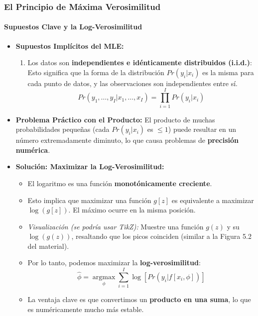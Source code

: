 \documentclass[aspectratio=169, 10pt]{beamer}
\begin{document}
\begin{frame}[shrink]
	\frametitle{El Principio de Máxima Verosimilitud}
	\framesubtitle{Supuestos Clave y la Log-Verosimilitud}
	\begin{itemize}
		\item \textbf{Supuestos Implícitos del MLE:}
		\begin{enumerate}
			\item Los datos son \textbf{independientes e idénticamente distribuidos (i.i.d.)}: Esto significa que la forma de la distribución \(Pr(y_i|x_i)\) es la misma para cada punto de datos, y las observaciones son independientes entre sí.
			\begin{equation*}
				Pr(y_1, \dots, y_I|x_1, \dots, x_I) = \prod_{i=1}^{I} Pr(y_i|x_i) \tag{5.2}
			\end{equation*}
		\end{enumerate}
		\item \textbf{Problema Práctico con el Producto:} El producto de muchas probabilidades pequeñas (cada \(Pr(y_i|x_i)\) es \(\le 1\)) puede resultar en un número extremadamente diminuto, lo que causa problemas de \textbf{precisión numérica}.
		\item \textbf{Solución: Maximizar la Log-Verosimilitud:}
		\begin{itemize}
			\item El logaritmo es una función \textbf{monotónicamente creciente}.
			\item Esto implica que maximizar una función \(g[z]\) es equivalente a maximizar \(\log(g[z])\). El máximo ocurre en la misma posición.
			\item \textit{Visualización (se podría usar TikZ):} Muestre una función \(g(z)\) y su \(\log(g(z))\), resaltando que los picos coinciden (similar a la Figura 5.2 del material).
			\item Por lo tanto, podemos maximizar la \textbf{log-verosimilitud}:
			\begin{equation*}
				\hat{\phi} = \underset{\phi}{\operatorname{argmax}} \sum_{i=1}^{I} \log [Pr(y_i|f[x_i, \phi])] \tag{5.3}
			\end{equation*}
			\item La ventaja clave es que convertimos un \textbf{producto en una suma}, lo que es numéricamente mucho más estable.
		\end{itemize}
	\end{itemize}
\end{frame}
\end{document}
